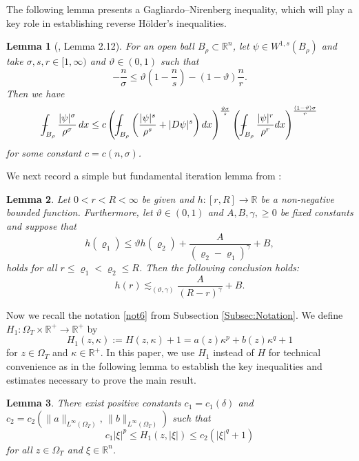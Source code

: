 \documentclass[11pt,oneside, english,reqno,twoside a4paper]{amsart}
\newtheorem{lemma}{Lemma}[section]
\theoremstyle{definition}
\numberwithin{theorem}{section}
\numberwithin{equation}{section}
\newcommand{\RR}{\mathbb{R}}
\newcommand{\apprle}{\lesssim}
\def\Xint#1{\mathchoice
	{\XXint\displaystyle\textstyle{#1}}%
	{\XXint\textstyle\scriptstyle{#1}}%
	{\XXint\scriptstyle\scriptscriptstyle{#1}}%
	{\XXint\scriptscriptstyle\scriptscriptstyle{#1}}%
	\!\int}
\def\XXint#1#2#3{{\setbox0=\hbox{$#1{#2#3}{\int}$}
		\vcenter{\hbox{$#2#3$}}\kern-.50\wd0}}
\def\dashint{\Xint-}
\newcommand{ \mr }{ \mathbb{R} }
\begin{document}
The following lemma presents a Gagliardo–Nirenberg inequality, which will play a key role in establishing reverse H\"{o}lder's inequalities.
\begin{lemma}[\cite{Hasto_2021}, Lemma 2.12]\label{lem : lemma 2.1}
For an open ball $B_{\rho}\subset \mathbb{R}^n$, let $\psi \in W^{1, s}(B_{\rho})$ and take $\sigma, s, r \in[1, \infty)$ and $\vartheta \in(0,1)$ such that
    $$
    -\frac{n}{\sigma} \leq \vartheta\left(1-\frac{n}{s}\right)-(1-\vartheta) \frac{n}{r}.
    $$
    Then we have
    $$
    \dashint_{B_{\rho}} \frac{|\psi|^\sigma}{\rho^\sigma} \, d x \leq c\left(\dashint_{B_{\rho}}\left(\frac{|\psi|^s}{\rho^s}+|D\psi|^s\right) d x\right)^{\frac{\vartheta \sigma}{s}}\left(\dashint_{B_{\rho}} \frac{|\psi|^r}{\rho^r} d x\right)^{\frac{(1-\vartheta) \sigma}{r}}
    $$
    for some constant $c=c(n, \sigma)$.
\end{lemma}

 
We next record a simple but fundamental iteration lemma from \cite[Lemma 1.1]{GG82}:
\begin{lemma}
	\label{iter_lemma}
	Let $0< r< R<\infty$ be given and $h : [r, R] \to \RR$ be a non-negative bounded function. Furthermore, let $\vartheta \in (0,1)$ and $A,B,\gamma, \geq 0$ be fixed constants and 
	suppose that
	$$
	h(\varrho_1) \leq \vartheta h(\varrho_2) + \frac{A}{(\varrho_2-\varrho_1)^{\gamma}} + B,
	$$
	holds for all $r \leq \varrho_1 < \varrho_2 \leq R$.
    Then the following conclusion holds:
	$$
	h(r) \apprle_{(\vartheta,\gamma)} \frac{A}{(R-r)^{\gamma}} + B.
	$$
\end{lemma} 

Now we recall the notation \ref{not6} from Subsection \ref{Subsec:Notation}. We define $H_1:\Omega_T\times  \mr^+\rightarrow \mr^+$ by
$$
H_1(z,\kappa):=H(z,\kappa)+1=a(z)\kappa^p+b(z)\kappa^q+1
$$
for $z\in\Omega_T$ and $\kappa\in\mr^+$.
In this paper, we use $H_1$ instead of $H$ for technical convenience as in the following lemma to establish the key inequalities and estimates necessary to prove the main result.

\begin{lemma} \label{lem : bounds of H_1}
     There exist positive constants $c_1 = c_1(\delta)$ and $c_2 = c_2(\|a\|_{L^\infty(\Omega_T)},\,\|b\|_{L^\infty(\Omega_T)})$ such that 
 \begin{equation*}\label{eq:bounds of H_1}
     c_1|\xi|^p \leq H_1(z,|\xi|) \leq c_2 (|\xi|^q+1)
 \end{equation*}
 for all $z \in \Omega_T$ and $\xi \in \mathbb{R}^n$.
\end{lemma}
\end{document}
